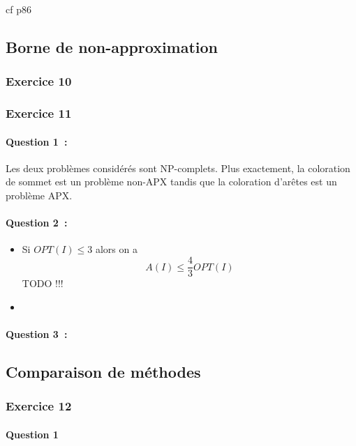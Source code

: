 \documentclass[a4paper, 12pt]{article}
\begin{document}
cf p86

\subsection{Borne de non-approximation}

\subsubsection*{Exercice 10}

\subsubsection*{Exercice 11}

\paragraph{Question 1~:}

Les deux problèmes considérés sont NP-complets. Plus exactement, la
coloration de sommet est un problème non-APX tandis que la coloration
d'arêtes est un problème APX. 

\paragraph{Question 2~:}
\begin{itemize}
\item Si $OPT(I) \leq 3$ alors on a
\begin{equation}
A(I) \leq \frac{4}{3}OPT(I) 
\end{equation}
TODO !!!
\item
\end{itemize}

\paragraph{Question 3~:}

\subsection{Comparaison de méthodes}

\subsubsection*{Exercice 12}

\paragraph{Question 1}
\end{document}
